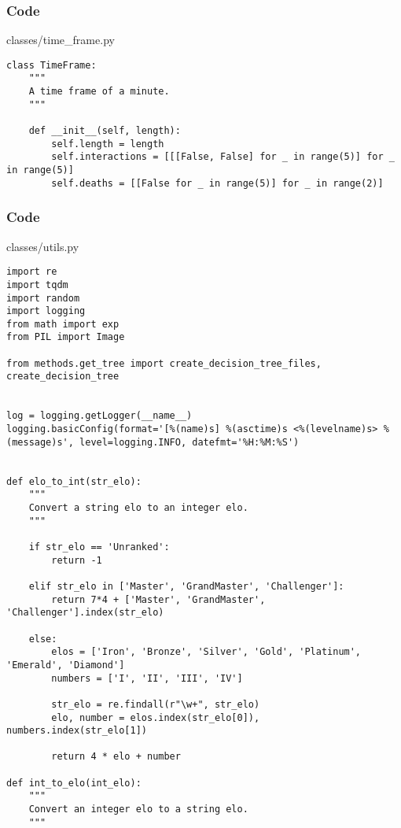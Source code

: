 \documentclass{beamer}
\begin{document}

\begin{frame}[t, fragile]
    \frametitle{Code}
    \scriptsize
    classes/time\_frame.py \newline
    \fontsize{3pt}{5pt}\selectfont
    \begin{verbatim}
class TimeFrame:
    """
    A time frame of a minute.
    """
    
    def __init__(self, length):
        self.length = length
        self.interactions = [[[False, False] for _ in range(5)] for _ in range(5)]
        self.deaths = [[False for _ in range(5)] for _ in range(2)]
    \end{verbatim}
\end{frame}


\begin{frame}[fragile]
    \frametitle{Code}
    \scriptsize
    classes/utils.py \newline
    \fontsize{3pt}{5pt}\selectfont
    \begin{verbatim}
import re
import tqdm
import random
import logging
from math import exp
from PIL import Image

from methods.get_tree import create_decision_tree_files, create_decision_tree


log = logging.getLogger(__name__)
logging.basicConfig(format='[%(name)s] %(asctime)s <%(levelname)s> %(message)s', level=logging.INFO, datefmt='%H:%M:%S')


def elo_to_int(str_elo):
    """
    Convert a string elo to an integer elo.
    """
    
    if str_elo == 'Unranked':
        return -1
    
    elif str_elo in ['Master', 'GrandMaster', 'Challenger']:
        return 7*4 + ['Master', 'GrandMaster', 'Challenger'].index(str_elo)
    
    else:
        elos = ['Iron', 'Bronze', 'Silver', 'Gold', 'Platinum', 'Emerald', 'Diamond']
        numbers = ['I', 'II', 'III', 'IV']

        str_elo = re.findall(r"\w+", str_elo)
        elo, number = elos.index(str_elo[0]), numbers.index(str_elo[1])

        return 4 * elo + number
    
def int_to_elo(int_elo):
    """
    Convert an integer elo to a string elo.
    """
    \end{verbatim}
\end{frame}
\end{document}
